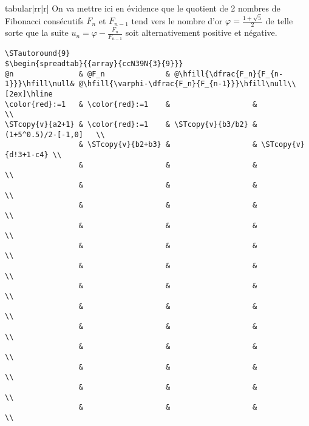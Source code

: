 \documentclass[a4paper,10pt]{article}
\begin{document}
\begin{spreadtab}{{tabular}{|rr|r|}}
On va mettre ici en évidence que le quotient de 2 nombres de Fibonacci consécutifs $F_n$ et $F_{n-1}$ tend vers le nombre d'or $\varphi=\frac{1+\sqrt{5}}{2}$ de telle sorte que la suite $u_n=\varphi-\frac{F_n}{F_{n-1}}$ soit alternativement positive et négative.\par\nobreak
\begin{lstlisting}
\STautoround{9}
$\begin{spreadtab}{{array}{ccN39N{3}{9}}}
@n               & @F_n              & @\hfill{\dfrac{F_n}{F_{n-1}}}\hfill\null& @\hfill{\varphi-\dfrac{F_n}{F_{n-1}}}\hfill\null\\[2ex]\hline
\color{red}:=1   & \color{red}:=1    &                   &                      \\
\STcopy{v}{a2+1} & \color{red}:=1    & \STcopy{v}{b3/b2} & (1+5^0.5)/2-[-1,0]   \\
                 & \STcopy{v}{b2+b3} &                   & \STcopy{v}{d!3+1-c4} \\
                 &                   &                   &                      \\
                 &                   &                   &                      \\
                 &                   &                   &                      \\
                 &                   &                   &                      \\
                 &                   &                   &                      \\
                 &                   &                   &                      \\
                 &                   &                   &                      \\
                 &                   &                   &                      \\
                 &                   &                   &                      \\
                 &                   &                   &                      \\
                 &                   &                   &                      \\
                 &                   &                   &                      \\
                 &                   &                   &                      \\

\end{lstlisting}
\end{spreadtab}
\end{document}
